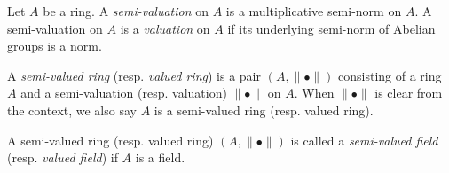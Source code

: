 \begin{definition}
    Let $A$ be a ring. A \emph{semi-valuation} on $A$ is a multiplicative semi-norm on $A$. A semi-valuation on $A$ is a \emph{valuation} on $A$ if its underlying semi-norm of Abelian groups is a norm. 
\end{definition}

\begin{definition}
    A \emph{semi-valued ring} (resp. \emph{valued ring}) is a pair $(A,\|\bullet\|)$ consisting of a ring $A$ and a semi-valuation (resp. valuation) $\|\bullet\|$ on $A$. When $\|\bullet\|$ is clear from the context, we also say $A$ is a semi-valued  ring (resp. valued ring).

    A semi-valued ring (resp. valued ring) $(A,\|\bullet\|)$ is called a \emph{semi-valued field} (resp. \emph{valued field}) if $A$ is a field.
\end{definition}

\iffalse
\begin{lemma}\label{lma-gausslemmav1}
    Let $(A,\|\bullet\|)$ be a normed ring. Assume that 
    \begin{enumerate}
        \item For any $a\in A$, $a\neq 0$, there is a multiplicative element $m\in A$ and $s\in \mathbb{Z}_{>0}$ such that $\|ma^s\|=\|m\|\cdot \|a\|^s=1$;
        \item $\tilde{A}$ is an integral domain.
    \end{enumerate}
    Then $\|\bullet\|$ is a valuation.
\end{lemma}
\begin{proof}
    Take $a_1,a_2\in A$ such that $|a_1a_2|<|a_1|\cdot |a_2|$. By (1), we can
    choose multiplicative elements $m_1,m_2\in A$ and $s_1,s_2\in \mathbb{Z}_{>0}$ so that
    \[
        \|m_1a_1^{s_1}\|=\|m_1\|\cdot\|a_1\|^{s_1}=1,\quad \|m_2a_2^{s_2}\|=\|m_2\|\cdot\|a_2\|^{s_2}=1.  
    \]
    In particular, $m_ia_i^{s_i}\in \mathring{A}\setminus \check{A}$ for $i=1,2$. We may assume that $s_2\geq s_1$. As $m_1,m_2$ are multiplicative, we find
    \[
        \begin{split}
            \|(m_1a_1^{s_1})(m_2a_2^{s_2})\|=\|m_1\|\cdot\|m_2\|\cdot \|a_1^{s_1}a_2^{s_2}\|\leq \|m_1\|\cdot\|m_2\|\cdot \|a_1a_2\|^{s_1}\|a_2\|^{s_2-s_1} \\
            < \|m_1\|\cdot\|m_2\|\cdot (\|a_1\| \cdot\|a_2\|)^{s_1}\|a_2\|^{s_2-s_1}=1.
        \end{split}
    \]
    This contradicts (2).
\end{proof}
\fi

